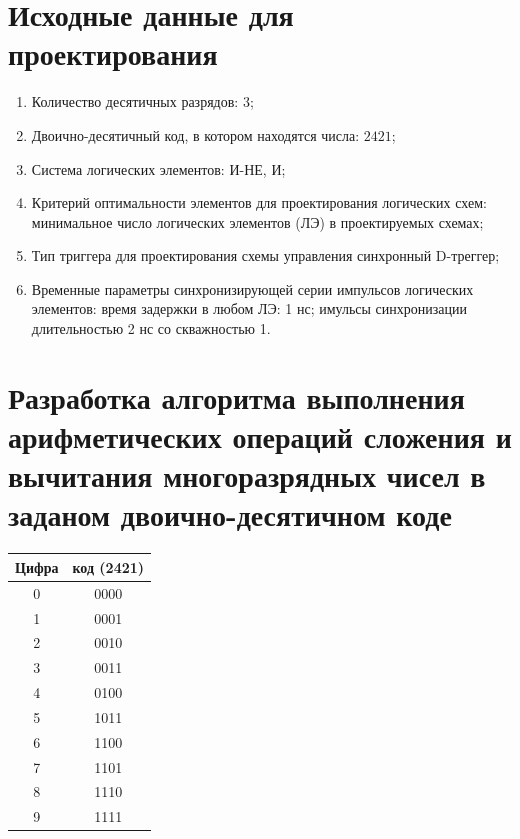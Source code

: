 \documentclass[a4paper,14pt]{article}
\begin{document}


\section{Исходные данные для проектирования}


\begin{enumerate}
	\item Количество десятичных разрядов: $3$;
	\item Двоично-десятичный код, в котором находятся числа: $2421$;
	\item Система логических элементов: И-НЕ, И;
	\item Критерий оптимальности элементов для проектирования логических схем: минимальное число логических элементов (ЛЭ) в проектируемых схемах;
	\item Тип триггера для проектирования схемы управления синхронный D-треггер;
	\item Временные параметры синхронизирующей серии импульсов логических элементов: 
	время задержки в любом ЛЭ: 1 нс; 
	имульсы синхронизации длительностью 2 нс со скважностью 1. 
\end{enumerate}

\section{Разработка алгоритма выполнения арифметических операций сложения и вычитания многоразрядных чисел в заданом двоично-десятичном коде}

\begin{table}[H]
	\begin{tabular}{|c|c|}
		\hline
		\multicolumn{1}{|l|}{Цифра} & \multicolumn{1}{l|}{код (2421)} \\ \hline
		0 & 0000 \\ \hline
		1 & 0001 \\ \hline
		2 & 0010 \\ \hline
		3 & 0011 \\ \hline
		4 & 0100 \\ \hline
		5 & 1011 \\ \hline
		6 & 1100 \\ \hline
		7 & 1101 \\ \hline
		8 & 1110 \\ \hline
		9 & 1111 \\ \hline
	\end{tabular}
\end{table}
\end{document}

